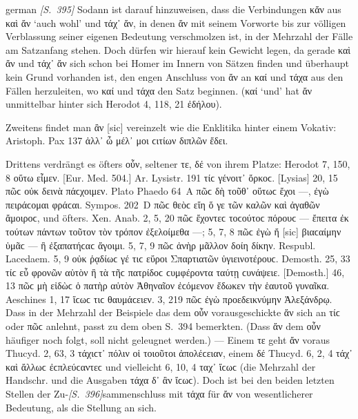 \begin{otherlanguage*}{german}
\hypertarget{p395}{\emph{[S.~395]}}\label{p395} Sodann ist darauf hinzuweisen, dass die Verbindungen κἄν aus καὶ ἄν ‘auch wohl’ und τάχ᾽ ἄν, in denen ἄν mit seinem Vorworte bis zur völligen Verblassung seiner eigenen Bedeutung verschmolzen ist, in der Mehrzahl der Fälle am Satzanfang stehen. Doch dürfen wir hierauf kein Gewicht legen, da gerade καὶ ἄν und τάχ᾽ ἄν sich schon bei Homer im Innern von Sätzen finden und überhaupt kein Grund vorhanden ist, den engen Anschluss von ἄν an καί und τάχα aus den Fällen herzuleiten, wo καί und τάχα den Satz beginnen. (καί ‘und’ hat ἄν unmittelbar hinter sich Herodot 4, 118, 21  ἐδήλου).

Zweitens findet man ἂν [sic] vereinzelt wie die Enklitika hinter einem Vokativ: Aristoph. Pax 137 ἀλλ᾽ ὦ μέλ᾽  μοι ϲιτίων διπλῶν ἔδει.

Drittens verdrängt es öfters οὖν, seltener τε, δέ von ihrem Platze: Herodot 7, 150, 8 οὕτω  εἶμεν. [Eur. Med. 504.] Ar. Lysistr. 191 τίϲ  γένοιτ᾽  ὄρκοϲ. [Lysias] 20, 15 πῶϲ  οὐκ  δεινὰ πάϲχοιμεν. Plato Phaedo 64~Α πῶϲ  δὴ τοῦθ᾽ οὕτωϲ ἔχοι —, ἐγὼ πειράϲομαι φράϲαι. Sympos. 202~D πῶϲ  θεὸϲ εἴη ὅ γε τῶν καλῶν καὶ ἀγαθῶν ἄμοιροϲ, und öfters. Xen. Anab. 2, 5, 20 πῶϲ  ἔχοντεϲ τοϲούτοϲ πόρουϲ — ἔπειτα ἐκ τούτων πάντων τοῦτον  τὸν τρόπον ἐξελοίμεθα —; 5, 7, 8 πῶϲ  ἐγὼ ἤ [sic] βιαϲαίμην ὑμᾶϲ — ἢ ἐξαπατήϲαϲ ἄγοιμι. 5, 7, 9 πῶϲ  ἀνὴρ μᾶλλον δοίη δίκην. Respubl. Lacedaem. 5, 9 οὐκ  ῥᾳδίωϲ γέ τιϲ εὕροι Σπαρτιατῶν ὑγιεινοτέρουϲ. Demosth. 25, 33 τίϲ  εὖ φρονῶν αὑτὸν  ἢ τὰ τῆϲ πατρίδοϲ ϲυμφέροντα ταύτῃ ϲυνάψειε. [Demosth.] 46, 13 πῶϲ  μὴ εἰδὼϲ ὁ πατὴρ αὐτὸν Ἀθηναῖον ἐϲόμενον ἔδωκεν  τὴν ἑαυτοῦ γυναῖκα. Aeschines 1, 17 ἴϲωϲ  τιϲ θαυ\-μά\-ϲειεν. 3, 219 πῶϲ  ἐγὼ προεδεικνύμην Ἀλεξάνδρῳ. Dass in der Mehrzahl der Beispiele das dem οὖν vorausgeschickte ἄν sich an τίϲ oder πῶϲ anlehnt, passt zu dem oben S.~394 bemerkten. (Dass ἄν dem οὖν häufiger noch folgt, soll nicht geleugnet werden.) — Einem τε geht ἄν voraus Thucyd. 2, 63, 3 τάχιϲτ᾽  πόλιν οἱ τοιοῦτοι ἀπολέϲειαν, einem δέ Thucyd. 6, 2, 4 τάχ᾽  καὶ ἄλλωϲ ἐϲπλεύϲαντεϲ und vielleicht 6, 10, 4 ταχ᾽  ἴϲωϲ (die Mehrzahl der Handschr. und die Ausgaben τάχα δ᾽ ἂν ἴϲωϲ). Doch ist bei den beiden letzten Stellen der Zu-\hypertarget{p396}{\emph{[S.~396]}}\label{p396}sammenschluss mit τάχα für ἄν von wesentlicherer Bedeutung, als die Stellung an sich.


\end{otherlanguage*}
